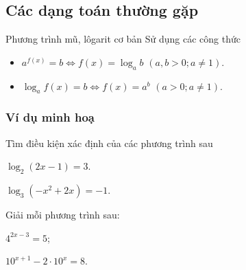 \subsection{Các dạng toán thường gặp}
\begin{dang}{Phương trình mũ, lôgarit cơ bản}
	Sử dụng các công thức
	\begin{itemize}
		\item $a^{f(x)}=b \Leftrightarrow f(x)=\log_a b$ $(a,b>0; a\neq 1)$.
		\item $\log_a f(x)=b\Leftrightarrow f(x)=a^b$ $(a>0;a\neq 1)$.
	\end{itemize}
\end{dang}
\subsubsection{Ví dụ minh hoạ}

\begin{vd}%
	Tìm điều kiện xác định của các phương trình sau
	\begin{listEX}[2]
		\item $\log_2(2x-1)=3$.
		\item $\log_3\left(-x^2+2x\right)=-1$.
	\end{listEX}
\end{vd}

\begin{vd} %
	Giải mỗi phương trình sau:
	\begin{listEX}[2]
		\item $4^{2x-3}=5$;
		\item $10^{x+1}-2\cdot 10^x=8$.
	\end{listEX}
\end{vd}

